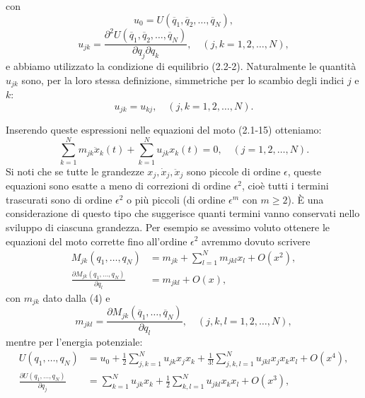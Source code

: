 \documentclass[11pt, a4paper]{book}
\numberwithin{equation}{section}
\begin{document}
con
\begin{equation}
u_0 = U(\overline{q}_1, \overline{q}_2, \dots, \overline{q}_N),
\end{equation}
\begin{equation}
u_{jk} = \frac{\partial^2 U(\overline{q}_1, \overline{q}_2, \dots, \overline{q}_N)}{\partial q_j \partial q_k}, \quad (j, k = 1, 2, \dots, N),
\end{equation}
e abbiamo utilizzato la condizione di equilibrio (2.2-2). Naturalmente le quantità $u_{jk}$ sono, per la loro stessa definizione, simmetriche per lo scambio degli indici $j$ e $k$:
\begin{equation}
u_{jk} = u_{kj}, \quad (j, k = 1, 2, \dots, N).
\end{equation}

Inserendo queste espressioni nelle equazioni del moto (2.1-15) otteniamo:
\begin{equation}
\sum_{k=1}^{N} m_{jk} \ddot{x}_k(t) + \sum_{k=1}^{N} u_{jk} x_k(t) = 0, \quad (j = 1, 2, \dots, N).
\end{equation}
Si noti che se tutte le grandezze $x_j, \dot{x}_j, \ddot{x}_j$ sono piccole di ordine $\epsilon$, queste equazioni sono esatte a meno di correzioni di ordine $\epsilon^2$, cioè tutti i termini trascurati sono di ordine $\epsilon^2$ o più piccoli (di ordine $\epsilon^m$ con $m \geq 2$). È una considerazione di questo tipo che suggerisce quanti termini vanno conservati nello sviluppo di ciascuna grandezza. Per esempio se avessimo voluto ottenere le equazioni del moto corrette fino all'ordine $\epsilon^2$ avremmo dovuto scrivere
\begin{align*}
M_{jk}(q_1, \dots, q_N) &= m_{jk} + \sum_{l=1}^{N} m_{jkl} x_l + O(x^2), \\
\frac{\partial M_{jk}(q_1, \dots, q_N)}{\partial q_l} &= m_{jkl} + O(x),
\end{align*}
con $m_{jk}$ dato dalla (4) e
\begin{equation*}
m_{jkl} = \frac{\partial M_{jk}(\overline{q}_1, \dots, \overline{q}_N)}{\partial q_l}, \quad (j, k, l = 1, 2, \dots, N),
\end{equation*}
mentre per l'energia potenziale:
\begin{align*}
U(q_1, \dots, q_N) &= u_0 + \frac{1}{2} \sum_{j,k=1}^{N} u_{jk} x_j x_k + \frac{1}{3!} \sum_{j,k,l=1}^{N} u_{jkl} x_j x_k x_l + O(x^4), \\
\frac{\partial U(q_1, \dots, q_N)}{\partial q_j} &= \sum_{k=1}^{N} u_{jk} x_k + \frac{1}{2} \sum_{k,l=1}^{N} u_{jkl} x_k x_l + O(x^3),
\end{align*}
\end{document}
